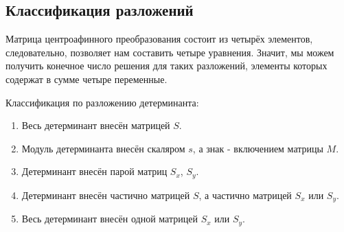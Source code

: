\subsection{Классификация разложений}

Матрица центроафинного преобразования состоит из четырёх элементов, следовательно, позволяет нам составить четыре уравнения. Значит, мы можем получить конечное число решения для таких разложений, элементы которых содержат в сумме четыре переменные.

Классификация по разложению детерминанта:
\begin{enumerate}
\item Весь детерминант внесён матрицей $S$.
\item Модуль детерминанта внесён скаляром $s$, а знак - включением матрицы $M$.
\item Детерминант внесён парой матриц $S_x$, $S_y$.
\item Детерминант внесён частично матрицей $S$, а частично матрицей $S_x$ или $S_y$.
\item Весь детерминант внесён одной матрицей $S_x$ или $S_y$.
\end{enumerate}


